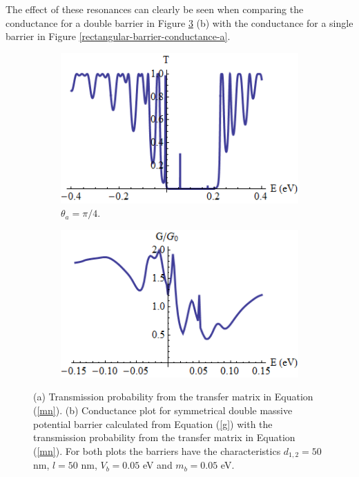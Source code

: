 \documentclass[12pt,a4paper]{report}
\begin{document}
				The effect of these resonances can clearly be seen when comparing the conductance for a double barrier in Figure \ref{doubletransmissionplotg} (b) with the conductance for a single barrier in Figure \ref{rectangular-barrier-conductance-a}.
\begin{figure}
	\begin{subfigure}{0.5\textwidth}
		\centerline{\includegraphics[scale=0.6]{images/double-potential-mass}}
		\caption{$\theta_{a}=\pi/4$.}
		\label{doubletransmissionplotga}
	\end{subfigure}
	\hspace{0.6cm}
	\begin{subfigure}{0.5\textwidth}
		\centerline{\includegraphics[scale=0.6]{images/double-potential-g}}
		\caption{}
		\label{doublegplot}
	\end{subfigure}
	\caption{(a) Transmission probability from the transfer matrix in Equation (\ref{mn}). (b) Conductance plot for symmetrical double massive potential barrier calculated from Equation (\ref{g}) with the transmission probability from the transfer matrix in Equation (\ref{mn}). For both plots the barriers have the characteristics $d_{1,2}=50$ nm, $l=50$ nm, $V_{b}=0.05$ eV and $m_{b}=0.05$ eV.}
	\label{doubletransmissionplotg}
\end{figure}
\end{document}
